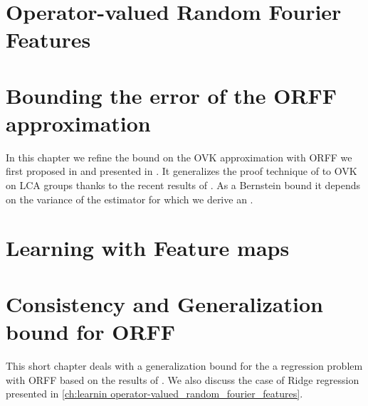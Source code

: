 
\chapter{Operator-valued Random Fourier Features}
\label{ch:operator-valued_random_fourier_features}
\bigskip
\begin{justify}
\end{justify}
\minitoc


\chapter{Bounding the error of the ORFF approximation} %
\label{ch:concistency_and_generalization}
\bigskip
\begin{justify}
    In this chapter we refine the bound on the \ac{OVK} approximation with
    \ac{ORFF} we first proposed in \cite{brault2016random} and presented in
    \cite{braultborne}. It generalizes the proof technique of
    \citet{Rahimi2007} to \ac{OVK} on \ac{LCA} groups thanks to the recent
    results of \citet{sutherland2015, tropp2015introduction, minsker2011some,
    koltchinskii2013remark}. As a Bernstein bound it depends on the variance of
    the estimator for which we derive an .
\end{justify}
\minitoc


\chapter{Learning with Feature maps}
\label{ch:learning operator-valued_random_fourier_features}
\bigskip
\begin{justify} 
\end{justify}
\minitoc


\chapter{Consistency and Generalization bound for ORFF}
\label{ch:generalization_for_ORFF}
\bigskip
\begin{justify} 
    This short chapter deals with a generalization bound for the a regression
    problem with ORFF based on the results of \citet{rahimi2009weighted,
    maurer2016vector}. We also discuss the case of Ridge regression presented
    in \cref{ch:learnin operator-valued_random_fourier_features}.
\end{justify}
\minitoc



